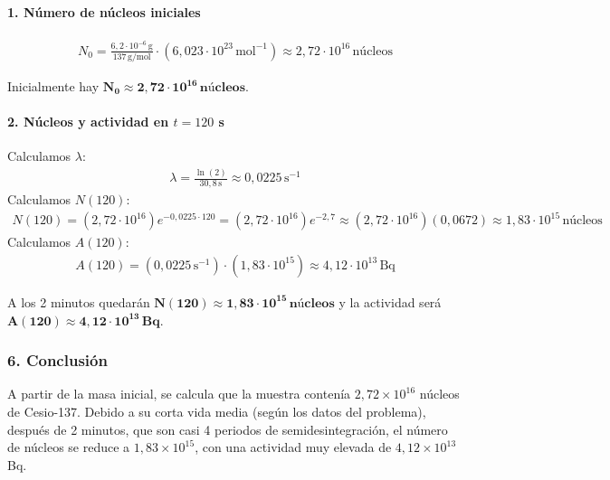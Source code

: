 \paragraph{1. Número de núcleos iniciales}
\begin{gather}
    N_0 = \frac{6,2 \cdot 10^{-6} \, \text{g}}{137 \, \text{g/mol}} \cdot (6,023 \cdot 10^{23} \, \text{mol}^{-1}) \approx 2,72 \cdot 10^{16} \, \text{núcleos}
\end{gather}
\begin{cajaresultado}
    Inicialmente hay $\boldsymbol{N_0 \approx 2,72 \cdot 10^{16} \, \textbf{núcleos}}$.
\end{cajaresultado}

\paragraph{2. Núcleos y actividad en $t=120$ s}
Calculamos $\lambda$:
\begin{gather}
    \lambda = \frac{\ln(2)}{30,8 \, \text{s}} \approx 0,0225 \, \text{s}^{-1}
\end{gather}
Calculamos $N(120)$:
\begin{gather}
    N(120) = (2,72 \cdot 10^{16}) e^{-0,0225 \cdot 120} = (2,72 \cdot 10^{16}) e^{-2,7} \approx (2,72 \cdot 10^{16})(0,0672) \approx 1,83 \cdot 10^{15} \, \text{núcleos}
\end{gather}
Calculamos $A(120)$:
\begin{gather}
    A(120) = (0,0225 \, \text{s}^{-1}) \cdot (1,83 \cdot 10^{15}) \approx 4,12 \cdot 10^{13} \, \text{Bq}
\end{gather}
\begin{cajaresultado}
    A los 2 minutos quedarán $\boldsymbol{N(120) \approx 1,83 \cdot 10^{15} \, \textbf{núcleos}}$ y la actividad será $\boldsymbol{A(120) \approx 4,12 \cdot 10^{13} \, \textbf{Bq}}$.
\end{cajaresultado}

\subsubsection*{6. Conclusión}
\begin{cajaconclusion}
A partir de la masa inicial, se calcula que la muestra contenía $2,72 \times 10^{16}$ núcleos de Cesio-137. Debido a su corta vida media (según los datos del problema), después de 2 minutos, que son casi 4 periodos de semidesintegración, el número de núcleos se reduce a $1,83 \times 10^{15}$, con una actividad muy elevada de $4,12 \times 10^{13}$ Bq.
\end{cajaconclusion}

\newpage